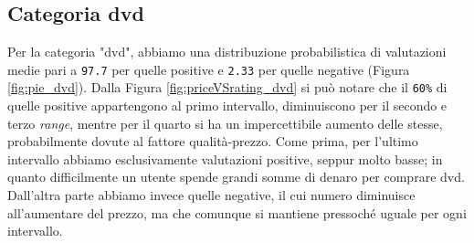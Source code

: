 			
			\subsection{Categoria dvd}
				Per la categoria "dvd", abbiamo una distribuzione probabilistica di valutazioni medie pari a \verb|97.7| per quelle positive e \verb|2.33| per quelle negative (Figura \ref{fig:pie_dvd}).
				Dalla Figura \ref{fig:priceVSrating_dvd} si può notare che il \verb|60%| di quelle positive appartengono al primo intervallo, diminuiscono per il secondo e terzo \textit{range}, mentre per il quarto si ha un impercettibile aumento delle stesse, probabilmente dovute al fattore qualità-prezzo. Come prima, per l'ultimo intervallo abbiamo esclusivamente valutazioni positive, seppur molto basse; in quanto difficilmente un utente spende grandi somme di denaro per comprare dvd. Dall'altra parte abbiamo invece quelle negative, il cui numero diminuisce all'aumentare del prezzo, ma che comunque si mantiene pressoché uguale per ogni intervallo.
				
